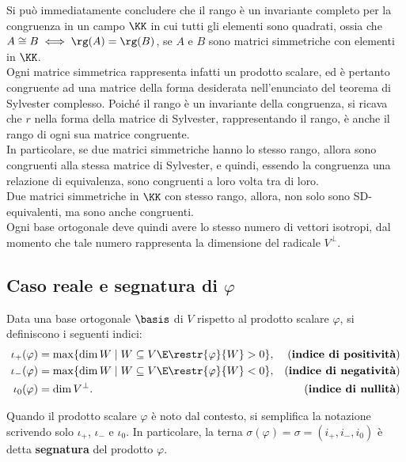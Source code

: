 \begin{remark}\nl
	\li Si può immediatamente concludere che il rango è un invariante
	completo per la congruenza in un campo $\KK$ in cui tutti gli elementi
	sono quadrati, ossia che $A \cong B \iff \rg(A) = \rg(B)$, se $A$ e
	$B$ sono matrici simmetriche con elementi in $\KK$. \\
	
	Ogni matrice simmetrica rappresenta infatti un prodotto scalare, ed è
	pertanto congruente ad una matrice della forma desiderata
	nell'enunciato del teorema di Sylvester complesso. Poiché il rango
	è un invariante della congruenza, si ricava che $r$ nella forma
	della matrice di Sylvester, rappresentando il rango, è anche
	il rango di ogni sua matrice congruente. \\
	
	In particolare, se due
	matrici simmetriche hanno lo stesso rango, allora sono congruenti
	alla stessa matrice di Sylvester, e quindi, essendo la congruenza
	una relazione di equivalenza, sono congruenti a loro volta tra di loro. \\
	
	\li Due matrici simmetriche in $\KK$ con stesso rango, allora, non solo
	sono SD-equivalenti, ma sono anche congruenti. \\
	
	\li Ogni base ortogonale deve quindi avere lo stesso numero
	di vettori isotropi, dal momento che tale numero rappresenta
	la dimensione del radicale $V^\perp$.
\end{remark}

\subsection{Caso reale e segnatura di \texorpdfstring{$\varphi$}{φ}}

\begin{definition} 
	Data una base ortogonale $\basis$ di $V$ rispetto al prodotto
	scalare $\varphi$,
	si definiscono i seguenti indici:
	\begin{align*}
		\iota_+(\varphi) &= \max\{ \dim W \mid W \subseteq V \E \restr{\varphi}{W} > 0 \}, &\text{(}\textbf{indice di positività}\text{)} \\
		\iota_-(\varphi) &= \max\{ \dim W \mid W \subseteq V \E \restr{\varphi}{W} < 0 \}, &\text{(}\textbf{indice di negatività}\text{)}\\
		\iota_0(\varphi) &= \dim V^\perp. &\text{(}\textbf{indice di nullità}\text{)}
	\end{align*}
	
	Quando il prodotto scalare $\varphi$ è noto dal contesto, si
	semplifica la notazione
	scrivendo solo $\iota_+$, $\iota_-$ e $\iota_0$. In particolare,
	la terna $\sigma(\varphi) = \sigma = (i_+, i_-, i_0)$ è detta \textbf{segnatura} del
	prodotto $\varphi$.
\end{definition}

